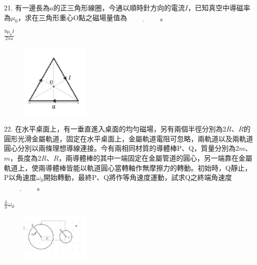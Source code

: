 \documentclass[cn,10pt,math=newtx]{elegantbook}
\begin{document}
\newpage


\begin{example}
   21. 有一邊長為$a$的正三角形線圈，今通以順時針方向的電流$I$，已知真空中導磁率為$\mu_0$，求在三角形重心O點之磁場量值為$\underline{\hspace{2cm}}$。\\
    \rightline{[桃園高中教甄109]}
\end{example}
\begin{solution}
    $\frac{9\mu_0 I}{2\pi a}$
\end{solution}
\begin{figure}[htbp]
    \flushright
    \includegraphics[width=0.3\textwidth]{image/109桃園21.png}
  \end{figure}
\newpage


\begin{example}
   22. 在水平桌面上，有一垂直進入桌面的均勻磁場，另有兩個半徑分別為2$R$、$R$的圓形光滑金屬軌道，固定在水平桌面上，金屬軌道電阻可忽略，兩軌道以及兩軌道圓心分別以兩條理想導線連接。今有兩相同材質的導體棒P、Q，質量分別為2$m$、$m$，長度為2$R$、$R$，兩導體棒的其中一端固定在金屬管道的圓心，另一端靠在金屬軌道上，使兩導體棒皆能以軌道圓心當轉軸作無摩擦力的轉動。初始時，Q靜止，P以角速度$\omega_0$開始轉動，最終P、Q將作等角速度運動，試求Q之終端角速度$\underline{\hspace{2cm}}$。\\
    \rightline{[桃園高中教甄109]}
\end{example}
\begin{solution}
    $\frac{4}{3} \omega_0$
\end{solution}
\begin{figure}[htbp]
    \flushright
    \includegraphics[width=0.3\textwidth]{image/109桃園22.png}
  \end{figure}
\newpage
\end{document}
